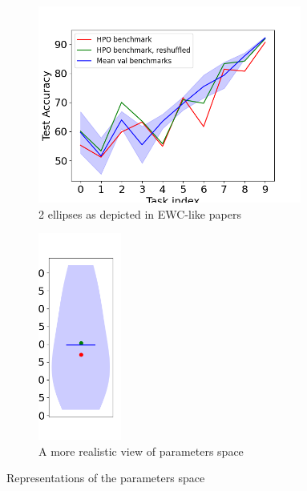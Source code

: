 \documentclass[twocolumn]{article}
\begin{document}
\begin{figure}
    \centering
    \begin{subfigure}[b]{0.35\textwidth}
        \centering
        \includegraphics[width=0.95\textwidth]{images/accuracy_through_benchmarks_greedy_HPO_GroHess_from_output_pMNIST_via_torch_standard_2024-07-16_20-54-00.png}
        \caption{2 ellipses as depicted in EWC-like papers}
        \label{fig:val_accs_matrix}
    \end{subfigure}
    \hspace{-0mm}
    \begin{subfigure}[b]{0.35\textwidth}
        \centering
        \includegraphics[width=0.3\textwidth]{images/violin_greedy_HPO_GroHess_from_output_pMNIST_via_torch_standard_2024-07-16_20-54-01.png}
        \caption{A more realistic view of parameters space}
        \label{fig:graph_test_vs_val}
    \end{subfigure}
    \caption{Representations of the parameters space}
\end{figure}
\end{document}
